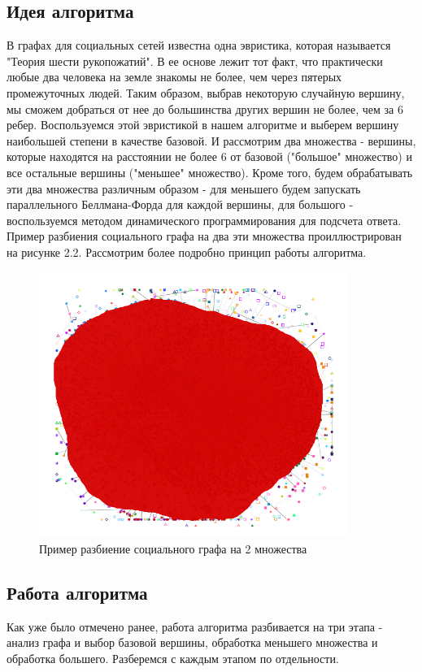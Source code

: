 \FloatBarrier
\subsection{Идея алгоритма}
В графах для социальных сетей известна одна эвристика, которая называется "Теория шести рукопожатий". В ее основе лежит тот факт, что практически любые два человека на земле знакомы не более, чем через пятерых промежуточных людей. Таким образом, выбрав некоторую случайную вершину, мы сможем добраться от нее до большинства других вершин не более, чем за 6 ребер. Воспользуемся этой эвристикой в нашем алгоритме и выберем вершину наибольшей степени в качестве базовой. И рассмотрим два множества - вершины, которые находятся на расстоянии не более 6 от базовой ("большое" множество) и все остальные вершины ("меньшее" множество). Кроме того, будем обрабатывать эти два множества различным образом - для меньшего будем запускать параллельного Беллмана-Форда для каждой вершины, для большого - воспользуемся методом динамического программирования для подсчета ответа. Пример разбиения социального графа на два эти множества проиллюстрирован на рисунке 2.2. Рассмотрим более подробно принцип работы алгоритма.

\begin{figure}[h]
\caption{Пример разбиение социального графа на 2 множества}
\centering
\includegraphics[width=0.9\textwidth]{img/floyd_social.png}
\end{figure}
\FloatBarrier

\FloatBarrier
\subsection{Работа алгоритма}
Как уже было отмечено ранее, работа алгоритма разбивается на три этапа - анализ графа и выбор базовой вершины, обработка меньшего множества и обработка большего. Разберемся с каждым этапом по отдельности.

